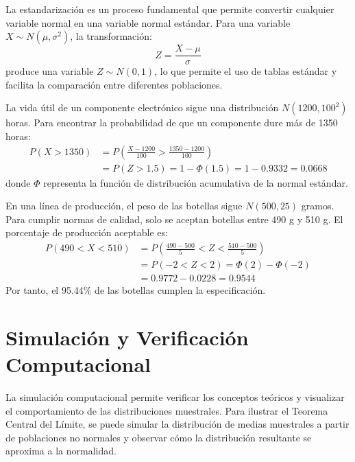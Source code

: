 \begin{remark}
La estandarización es un proceso fundamental que permite convertir cualquier variable normal en una variable normal estándar. Para una variable $X \sim N(\mu, \sigma^2)$, la transformación:
\begin{equation}
Z = \frac{X - \mu}{\sigma}
\end{equation}
produce una variable $Z \sim N(0,1)$, lo que permite el uso de tablas estándar y facilita la comparación entre diferentes poblaciones.
\end{remark}

\begin{example}
La vida útil de un componente electrónico sigue una distribución $N(1200, 100^2)$ horas. Para encontrar la probabilidad de que un componente dure más de 1350 horas:
\begin{align}
P(X > 1350) &= P\left(\frac{X-1200}{100} > \frac{1350-1200}{100}\right)\\
&= P(Z > 1.5) = 1 - \Phi(1.5) = 1 - 0.9332 = 0.0668
\end{align}
donde $\Phi$ representa la función de distribución acumulativa de la normal estándar.
\end{example}

\begin{example}
En una línea de producción, el peso de las botellas sigue $N(500, 25)$ gramos. Para cumplir normas de calidad, solo se aceptan botellas entre 490 g y 510 g. El porcentaje de producción aceptable es:
\begin{align}
P(490 < X < 510) &= P\left(\frac{490-500}{5} < Z < \frac{510-500}{5}\right)\\
&= P(-2 < Z < 2) = \Phi(2) - \Phi(-2)\\
&= 0.9772 - 0.0228 = 0.9544
\end{align}
Por tanto, el 95.44\% de las botellas cumplen la especificación.
\end{example}

\section{Simulación y Verificación Computacional}

\begin{remark}
La simulación computacional permite verificar los conceptos teóricos y visualizar el comportamiento de las distribuciones muestrales. Para ilustrar el Teorema Central del Límite, se puede simular la distribución de medias muestrales a partir de poblaciones no normales y observar cómo la distribución resultante se aproxima a la normalidad.
\end{remark}

